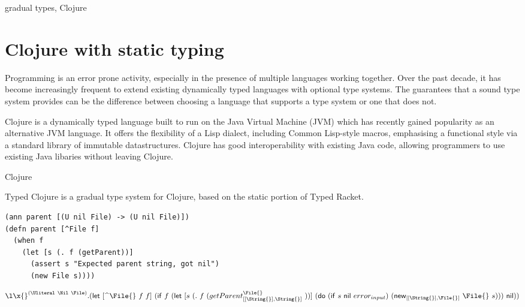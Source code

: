 \documentclass[preprint,9pt]{sigplanconf}
\theoremstyle{remark}
\theoremstyle{remark}
\begin{document}
\keywords
gradual types, Clojure

\section{Clojure with static typing}


Programming is an error prone activity, especially in the presence of
multiple languages working together. Over the past decade, it has become increasingly
frequent to extend existing dynamically typed languages with optional type systems.
The guarantees that a sound type system provides can be the difference between
choosing a language that supports a type system or one that does not.


Clojure is a dynamically typed language built to run on the Java Virtual Machine (JVM)
which has recently gained popularity as an alternative JVM language.
It offers the flexibility of a Lisp dialect, including Common Lisp-style macros,
emphasising a functional style via a standard library of immutable datastructures. 
Clojure has good interoperability with existing Java code, allowing programmers to
use existing Java libaries without leaving Clojure.


Clojure

Typed Clojure is a gradual type system for Clojure, based on the
static portion of Typed Racket.

\begin{lstlisting}
(ann parent [(U nil File) -> (U nil File)])
(defn parent [^File f]
  (when f
    (let [s (. f (getParent))]
      (assert s "Expected parent string, got nil")
      (new File s))))
\end{lstlisting}

$$
\abs{\x{}}{\Union{\Nil}{\File}}
{\letexp {\hinted{\File{}}{f}} {f}
  {\ifexp {f} 
    {\letexp {s} {\methodstaticexp {\File{}} {\String{}} {\String{}} {getParent} {f}}
      {\doexp {\ifexp {s}
                {\nil{}}
                {\errorval{input}}}
              {\newstaticexp {\String{}} {\File{}} {\File{}} {s}}}}
    {\nil{}}
}}
              $$


\end{document}
